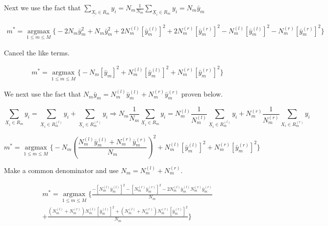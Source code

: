 \documentclass[11pt]{article}
\begin{document}
Next we use the fact that 
$\sum_{\underline{X_i} \in R_m} y_i = N_m\frac{1}{N_m} 
\sum_{\underline{X}_i \in R_m}y_i = N_m \bar{y}_m$

\begin{equation}
\begin{split}
m^* = \underset{1 \leq m \leq M}{\operatorname{argmax}} 
\Bigg\{-2N_m\bar{y}_m^2 +N_m\bar{y}_m^2 + 2N_m^{(l)}[\bar{y}_m^{(l)}]^2 +
 2N_m^{(r)}[\bar{y}_m^{(r)}]^2  -N_m^{(l)}[\bar{y}_m^{(l)}]^2 -N_m^{(r)}
 [\bar{y}_m^{(r)}]^2\Bigg\}
\end{split}
\end{equation}

Cancel the like terms. 

\begin {equation}
\begin{split}
m^* = \underset{1 \leq m \leq M}{\operatorname{argmax}} 
\Bigg\{-N_m[\bar{y}_m]^2 + N_m^{(l)}[\bar{y}_m^{(l)}]^2 
+N_m^{(r)}[\bar{y}_m^{(r)}]^2\Bigg\}
\end{split}
\end{equation}

We next use the fact that $N_m\bar{y}_m = N_m^{(l)}\bar{y}_m^{(l)} + 
N_m^{(r)}\bar{y}_m^{(r)}$ proven below.

$$ \sum_{\underline{X}_i \in R_m} y_i = \sum_{\underline{X}_i 
\in R_m^{(l)}}y_i + \sum_{\underline{X}_i \in R_m^{(r)}} y_i 
\Rightarrow N_m \frac{1}{N_m} \sum_{\underline{X}_i 
\in R_m}y_i = N_m^{(l)}\frac{1}{N_m^{(l)}} 
\sum_{\underline{X}_i \in R_m^{(l)}}y_i + N_m^{(r)}\frac{1}
{N_m^{(r)}}\sum_{X_i \in R_m^{(r)}}y_i $$

\begin {equation}
m^* = \underset{1 \leq m \leq M}{\operatorname{argmax}} 
\Bigg\{ -N_m ( \frac{N_m^{(l)}\bar{y}_m^{(l)} + 
N_m^{(r)}\bar{y}_m^{(r)}}{N_m})^2 + N_m^{(l)}[\bar{y}_m^{(l)}]^2 + 
N_m^{(r)}[\bar{y}_m^{(r)}]^2\Bigg\}
\end{equation}

Make a common denominator and use $N_m = N_m^{(l)} + N_m^{(r)}$.

\begin {equation}
\begin{split}
m^* = \underset{1 \leq m \leq M}{\operatorname{argmax}} 
\Bigg\{\frac{-[N_m^{(l)}\bar{y}_m^{(l)}]^2 - 
[N_m^{(r)}\bar{y}_m^{(r)}]^2-2N_m^{(l)}\bar{y}_m^{(l)}
N_m^{(r)}\bar{y}_m^{(r)}}{N_m}\\ 
+ \frac{(N_m^{(l)}+ N_m^{(r)})N_m^{(l)}[\bar{y}_m^{(l)}]^2 + 
(N_m^{(l)}+N_m^{(r)})N_m^{(r)}[\bar{y}_m^{(r)}]^2}{N_m}\Bigg\}
\end{split}
\end{equation}
\end{document}
